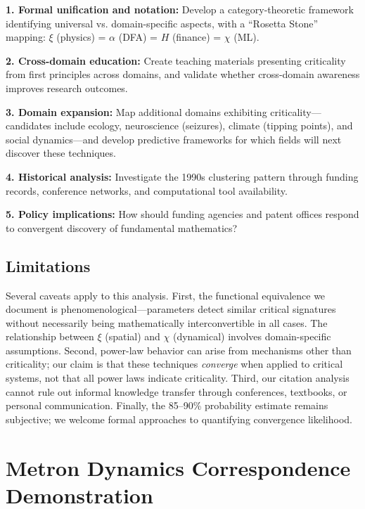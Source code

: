 \documentclass[11pt]{article}
\begin{document}
\textbf{1. Formal unification and notation:} Develop a category-theoretic framework identifying universal vs. domain-specific aspects, with a ``Rosetta Stone'' mapping: $\xi$ (physics) = $\alpha$ (DFA) = $H$ (finance) = $\chi$ (ML).

\textbf{2. Cross-domain education:} Create teaching materials presenting criticality from first principles across domains, and validate whether cross-domain awareness improves research outcomes.

\textbf{3. Domain expansion:} Map additional domains exhibiting criticality---candidates include ecology, neuroscience (seizures), climate (tipping points), and social dynamics---and develop predictive frameworks for which fields will next discover these techniques.

\textbf{4. Historical analysis:} Investigate the 1990s clustering pattern through funding records, conference networks, and computational tool availability.

\textbf{5. Policy implications:} How should funding agencies and patent offices respond to convergent discovery of fundamental mathematics?

\subsection{Limitations}

Several caveats apply to this analysis. First, the functional equivalence we document is phenomenological---parameters detect similar critical signatures without necessarily being mathematically interconvertible in all cases. The relationship between $\xi$ (spatial) and $\chi$ (dynamical) involves domain-specific assumptions. Second, power-law behavior can arise from mechanisms other than criticality; our claim is that these techniques \textit{converge} when applied to critical systems, not that all power laws indicate criticality. Third, our citation analysis cannot rule out informal knowledge transfer through conferences, textbooks, or personal communication. Finally, the 85--90\% probability estimate remains subjective; we welcome formal approaches to quantifying convergence likelihood.




\newpage
\appendix

\section{Metron Dynamics Correspondence Demonstration}
\end{document}
